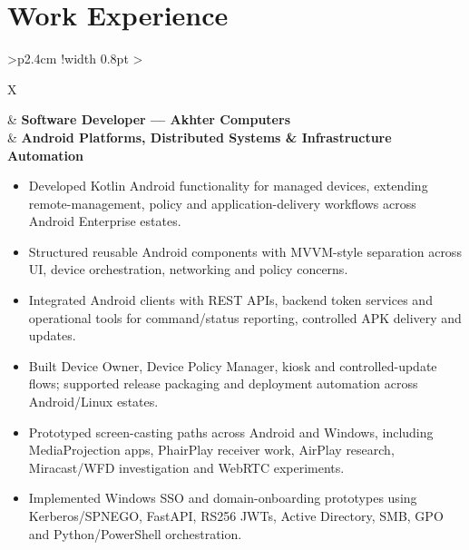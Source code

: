 \documentclass[11pt,a4paper]{article}
\begin{document}
\section*{Work Experience}

\renewcommand{\arraystretch}{1.08}
\begin{tabularx}{\textwidth}{>{\raggedleft\arraybackslash}p{2.4cm} !{\color{timelinegray}\vrule width 0.8pt} >{\raggedright\arraybackslash}X}
\textbf{\color{timelineblue}} &
\textbf{Software Developer --- Akhter Computers}\\
& {\small\color{timelinegray}\textbf{Android Platforms, Distributed Systems \& Infrastructure Automation}}
\par{\footnotesize
\begin{itemize}
    \item Developed Kotlin Android functionality for managed devices, extending remote-management, policy and application-delivery workflows across Android Enterprise estates.
    \item Structured reusable Android components with MVVM-style separation across UI, device orchestration, networking and policy concerns.
    \item Integrated Android clients with REST APIs, backend token services and operational tools for command/status reporting, controlled APK delivery and updates.
    \item Built Device Owner, Device Policy Manager, kiosk and controlled-update flows; supported release packaging and deployment automation across Android/Linux estates.
    \item Prototyped screen-casting paths across Android and Windows, including MediaProjection apps, PhairPlay receiver work, AirPlay research, Miracast/WFD investigation and WebRTC experiments.
    \item Implemented Windows SSO and domain-onboarding prototypes using Kerberos/SPNEGO, FastAPI, RS256 JWTs, Active Directory, SMB, GPO and Python/PowerShell orchestration.
\end{itemize}} \\[3pt]


\end{tabularx}
\end{document}

